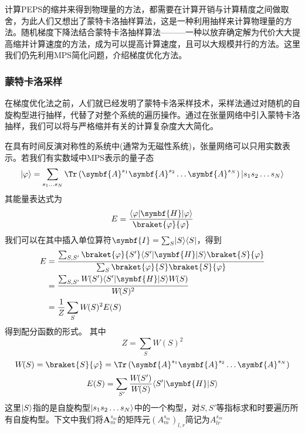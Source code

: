 计算PEPS的缩并来得到物理量的方法，都需要在计算开销与计算精度之间做取舍，为此人们又想出了蒙特卡洛抽样算法，这是一种利用抽样来计算物理量的方法。随机梯度下降法结合蒙特卡洛抽样算法———一种以放弃确定解为代价大大提高缩并计算速度的方法，成为可以提高计算速度，且可以大规模并行的方法。这里我们仍先利用MPS简化问题，介绍梯度优化方法。

\subsubsection{蒙特卡洛采样}

在梯度优化法之前，人们就已经发明了蒙特卡洛采样技术，采样法通过对随机的自旋构型进行抽样，代替了对整个系统的遍历操作。通过在张量网络中引入蒙特卡洛抽样\cite{liuGradientOptimizationFinite2017,wangMonteCarloSimulation2011,sandvikVariationalQuantumMonte2007}，我们可以将与严格缩并有关的计算复杂度大大简化。

在具有时间反演对称性的系统中(通常为无磁性系统)，张量网络可以只用实数表示。若我们有实数域中MPS表示的量子态
\begin{equation}\label{key}
\ket{\varphi} = \sum_{s_1\dots s_N}\Tr\left(\symbf{A}^{s_1}\symbf{A}^{s_2}\dots \symbf{A}^{s_N}\right)\ket{s_1 s_2\dots s_N}
\end{equation}
其能量表达式为
\begin{equation}\label{key}
E = \frac{\bra{\varphi}\symbf{H}\ket{\varphi}}{\braket{\varphi}{\varphi}}
\end{equation}
我们可以在其中插入单位算符$\symbf{I}=\sum_{S}\ket{S}\bra{S}$，得到
\begin{align*}
E &= \frac{\sum_{S,S'}\braket{\varphi}{S'}\bra{S'}\symbf{H}\ket{S}\braket{S}{\varphi}}{\sum_S\braket{\varphi}{S}\braket{S}{\varphi}}\\
	&= \frac{\sum_{S,S'}W\!(S')\bra{S'}\symbf{H}\ket{S}W\!(S)}{W\!(S)^2}\\
	&= \frac{1}{Z}\sum_S W\!(S)^2 E(S)
\end{align*}
得到配分函数的形式。
其中
\begin{equation}
Z = \sum_S W\!(S)^2
\end{equation}
\begin{equation}
W\!(S) = \braket{S}{\varphi} = \Tr\left(\symbf{A}^{s_1}\symbf{A}^{s_2}\dots \symbf{A}^{s_N}\right)
\end{equation}
\begin{equation}
E(S) = \sum_{S'}\frac{W\!(S')}{W\!(S)}\bra{S'}\symbf{H}\ket{S}
\end{equation}
这里$\lvert S\rangle$指的是自旋构型$\lvert s_1 s_2\dots s_N\rangle$中的一个构型，对$S,S'$等指标求和时要遍历所有自旋构型。下文中我们将$\symbf{A}^{s_m}_m$的矩阵元$(A^{s_m}_m)_{l,r}$简记为$A^{s_m}_{lr}$

